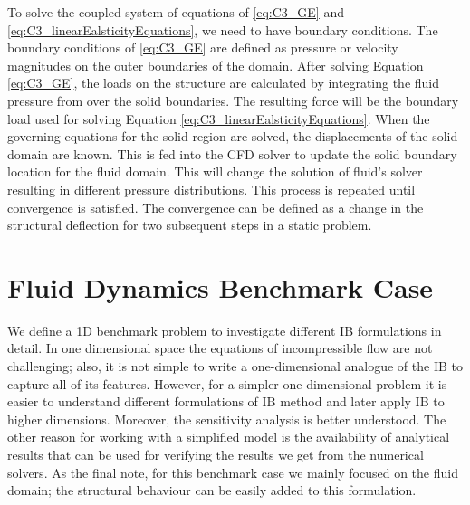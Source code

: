 To solve the coupled system of equations of \eqref{eq:C3_GE} and \eqref{eq:C3_linearEalsticityEquations}, we need to have boundary conditions. The boundary conditions of \eqref{eq:C3_GE} are defined as pressure or velocity magnitudes on the outer boundaries of the domain. After solving Equation \eqref{eq:C3_GE}, the loads on the structure are calculated by integrating the fluid pressure from over the solid boundaries. The resulting force will be the boundary load used for solving Equation \eqref{eq:C3_linearEalsticityEquations}. When the governing equations for the solid region are solved, the displacements of the solid domain are known. This is fed into the CFD solver to update the solid boundary location for the fluid domain. This will change the solution of fluid's solver resulting in different pressure distributions. This process is repeated until convergence is satisfied. The convergence can be defined as a change in the structural deflection for two subsequent steps in a static problem.
\section{Fluid Dynamics Benchmark Case}\label{sec:C3_benchmark_case}
We define a 1D benchmark problem to investigate different IB formulations in detail. In one dimensional space the equations of incompressible flow are not challenging; also, it is not simple to write a one-dimensional analogue of the IB to capture all of its features. However, for a simpler one dimensional problem it is easier to understand different formulations of IB method and later apply IB to higher dimensions. Moreover, the sensitivity analysis is better understood. The other reason for working with a simplified model is the availability of analytical results that can be used for verifying the results we get from the numerical solvers. As the final note, for this benchmark case we mainly focused on the fluid domain; the structural behaviour can be easily added to this formulation.

